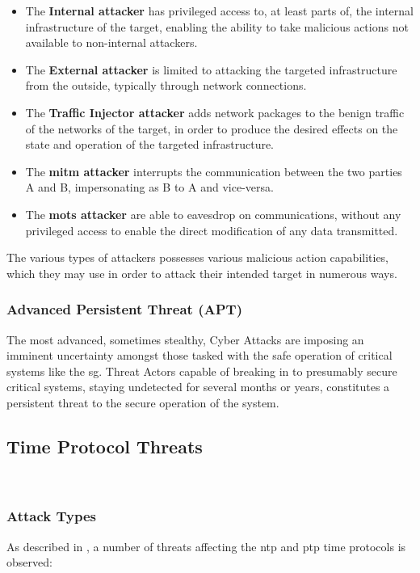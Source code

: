 \begin{itemize}
    \item The \textbf{Internal attacker} has privileged access to, at least parts of, the internal infrastructure of the target, enabling the ability to take malicious actions not available to non-internal attackers.
    \item The \textbf{External attacker} is limited to attacking the targeted infrastructure from the outside, typically through network connections.
    \item The \textbf{Traffic Injector attacker} adds network packages to the benign traffic of the networks of the target, in order to produce the desired effects on the state and operation of the targeted infrastructure. 
    \item The \textbf{\acrshort{mitm} attacker} interrupts the communication between the two parties A and B, impersonating as B to A and vice-versa.
    \item The  \textbf{\acrshort{mots} attacker} are able to eavesdrop on communications, without any privileged access to enable the direct modification of any data transmitted.
\end{itemize}



The various types of attackers possesses various malicious action capabilities, which they may use in order to attack their intended target in numerous ways.


\subsubsection{Advanced Persistent Threat (APT)}

The most advanced, sometimes stealthy, Cyber Attacks are imposing an imminent uncertainty amongst those tasked with the safe operation of critical systems like the \acrshort{sg}. Threat Actors capable of breaking in to presumably secure critical systems, staying undetected for several months or years, constitutes a persistent threat to the secure operation of the system.

\subsection{Time  Protocol Threats}








\
\subsubsection{Attack Types}
As described in \cite{mizrahi2014security}, a number of threats affecting the \acrshort{ntp} and  \acrshort{ptp} time protocols is observed:



